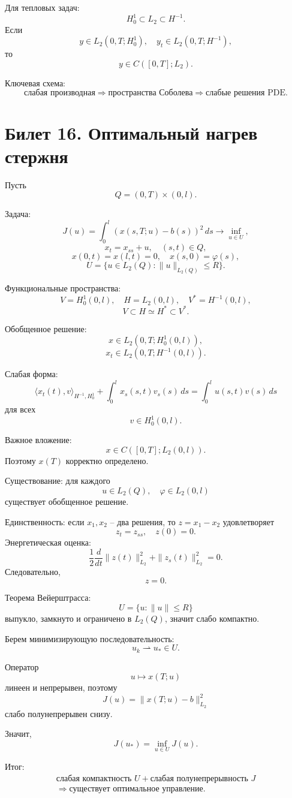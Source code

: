 \documentclass[12pt,a4paper]{article}
\begin{document}
Для тепловых задач:
\[
H_0^1\subset L_2\subset H^{-1}.
\]
Если
\[
y\in L_2(0,T;H_0^1),
\quad
y_t\in L_2(0,T;H^{-1}),
\]
то
\[
y\in C([0,T];L_2).
\]

Ключевая схема:
\[
\text{слабая производная}
\Rightarrow
\text{пространства Соболева}
\Rightarrow
\text{слабые решения PDE}.
\]

\newpage

\section*{Билет 16. Оптимальный нагрев стержня}

Пусть
\[
Q=(0,T)\times(0,l).
\]

Задача:
\[
J(u)=\int_0^l (x(s,T;u)-b(s))^2\,ds\to\inf_{u\in U},
\]
\[
x_t=x_{ss}+u,
\quad (s,t)\in Q,
\]
\[
x(0,t)=x(l,t)=0,
\quad
x(s,0)=\varphi(s),
\]
\[
U=\{u\in L_2(Q):\|u\|_{L_2(Q)}\le R\}.
\]

Функциональные пространства:
\[
V=H_0^1(0,l),
\quad H=L_2(0,l),
\quad V^*=H^{-1}(0,l),
\]
\[
V\subset H\simeq H^*\subset V^*.
\]

Обобщенное решение:
\[
x\in L_2(0,T;H_0^1(0,l)),
\]
\[
x_t\in L_2(0,T;H^{-1}(0,l)).
\]

Слабая форма:
\[
\langle x_t(t),v\rangle_{H^{-1},H_0^1}
+
\int_0^l x_s(s,t)v_s(s)\,ds
=
\int_0^l u(s,t)v(s)\,ds
\]
для всех
\[
v\in H_0^1(0,l).
\]

Важное вложение:
\[
x\in C([0,T];L_2(0,l)).
\]
Поэтому \(x(T)\) корректно определено.

Существование: для каждого
\[
u\in L_2(Q),
\quad
\varphi\in L_2(0,l)
\]
существует обобщенное решение.

Единственность: если \(x_1,x_2\) -- два решения, то \(z=x_1-x_2\) удовлетворяет
\[
z_t=z_{ss},
\quad z(0)=0.
\]
Энергетическая оценка:
\[
\frac12\frac{d}{dt}\|z(t)\|_{L_2}^2+
\|z_s(t)\|_{L_2}^2=0.
\]
Следовательно,
\[
z=0.
\]

Теорема Вейерштрасса:
\[
U=\{u:\|u\|\le R\}
\]
выпукло, замкнуто и ограничено в \(L_2(Q)\), значит слабо компактно.

Берем минимизирующую последовательность:
\[
u_k\rightharpoonup u_*\in U.
\]

Оператор
\[
u\mapsto x(T;u)
\]
линеен и непрерывен, поэтому
\[
J(u)=\|x(T;u)-b\|_{L_2}^2
\]
слабо полунепрерывен снизу.

Значит,
\[
J(u_*)=\inf_{u\in U}J(u).
\]

Итог:
\[
\begin{gathered}
\text{слабая компактность }U+\text{слабая полунепрерывность }J\\
\Rightarrow\text{существует оптимальное управление}.
\end{gathered}
\]
\end{document}
